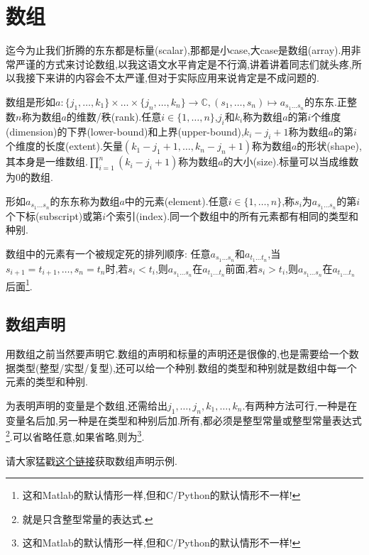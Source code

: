 \chapter{数组}\label{fortran_array}

迄今为止我们折腾的东东都是标量(scalar),那都是小case,大case是数组(array).用非常严谨的方式来讨论数组,以我这语文水平肯定是不行滴,讲着讲着同志们就头疼,所以我接下来讲的内容会不太严谨,但对于实际应用来说肯定是不成问题的.

数组是形如$a\!:\!\{j_1,\dots,k_1\}\!\times\!\dots\!\times\!\{j_n,\dots,k_n\}\rightarrow\mathbb{C},(s_1,\dots,s_n)\mapsto a_{s_1\dots s_n}$的东东.正整数$n$称为数组$a$的维数/秩(rank).任意$i\in\{1,\dots,n\}$,$j_i$和$k_i$称为数组$a$的第$i$个维度(dimension)的下界(lower-bound)和上界(upper-bound),$k_i-j_i+1$称为数组$a$的第$i$个维度的长度(extent).矢量$(k_1-j_1+1,\dots,k_n-j_n+1)$称为数组$a$的形状(shape),其本身是一维数组.$\prod_{i=1}^n(k_i-j_i+1)$称为数组$a$的大小(size).标量可以当成维数为$0$的数组.

形如$a_{s_1\dots s_n}$的东东称为数组$a$中的元素(element).任意$i\in\{1,\dots,n\}$,称$s_i$为$a_{s_1\dots s_n}$的第$i$个下标(subscript)或第$i$个索引(index).同一个数组中的所有元素都有相同的类型和种别.

数组中的元素有一个被规定死的排列顺序: 任意$a_{s_1\dots s_n}$和$a_{t_1\dots t_n}$,当$s_{i+1}=t_{i+1},\dots,s_n=t_n$时,若$s_i<t_i$,则$a_{s_1\dots s_n}$在$a_{t_1\dots t_n}$前面,若$s_i>t_i$,则$a_{s_1\dots s_n}$在$a_{t_1\dots t_n}$后面\footnote{这和Matlab的默认情形一样,但和C/Python的默认情形不一样!}.

\section{数组声明}\label{fortran_array_specification}

用数组之前当然要声明它.数组的声明和标量的声明还是很像的,也是需要给一个数据类型(整型/实型/复型),还可以给一个种别.数组的类型和种别就是数组中每一个元素的类型和种别.

为表明声明的变量是个数组,还需给出$j_1,\dots,j_n,k_1,\dots,k_n$.有两种方法可行,一种是在变量名后加,另一种是在类型和种别后加.所有,都必须是整型常量或整型常量表达式\footnote{
    就是只含整型常量的表达式.
}.可以省略任意,如果省略,则为\footnote{这和Matlab的默认情形一样,但和C/Python的默认情形不一样!}.

请大家猛戳\href{https://fortran-lang.org/learn/quickstart/arrays_strings#array-declaration}{这个链接}获取数组声明示例.

